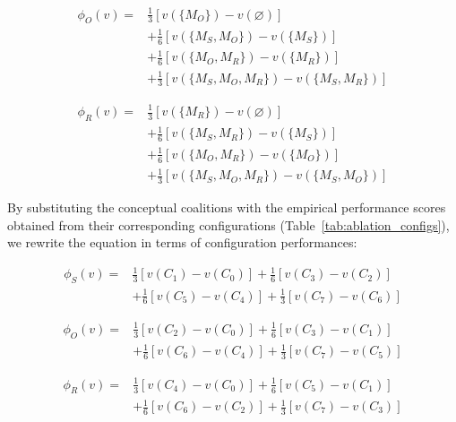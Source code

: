 \documentclass[preprint,review,12pt,authoryear]{elsarticle}
\begin{document}
\begin{equation}
    \begin{split}
        \phi_O(v) = {} & \frac{1}{3}[v(\{M_O\})-v(\varnothing)]           \\
                    & +\frac{1}{6}[v(\{M_S, M_O\})-v(\{M_S\})]         \\
                    & +\frac{1}{6}[v(\{M_O, M_R\})-v(\{M_R\})]         \\
                    & +\frac{1}{3}[v(\{M_S, M_O,M_R\})-v(\{M_S,M_R\})]
    \end{split}
\end{equation}

\begin{equation}
    \begin{split}
        \phi_R(v) = {} & \frac{1}{3}[v(\{M_R\})-v(\varnothing)]           \\
                    & +\frac{1}{6}[v(\{M_S, M_R\})-v(\{M_S\})]         \\
                    & +\frac{1}{6}[v(\{M_O, M_R\})-v(\{M_O\})]         \\
                    & +\frac{1}{3}[v(\{M_S, M_O,M_R\})-v(\{M_S,M_O\})]
    \end{split}
\end{equation}

By substituting the conceptual coalitions with the empirical performance scores obtained from their corresponding configurations (Table~\ref{tab:ablation_configs}), we rewrite the equation in terms of configuration performances:

\begin{equation}
    \begin{split}
        \phi_S(v) = {} & \frac{1}{3}[v(C_1)-v(C_0)]+\frac{1}{6}[v(C_3)-v(C_2)]  \\
                    & +\frac{1}{6}[v(C_5)-v(C_4)]+\frac{1}{3}[v(C_7)-v(C_6)]
    \end{split}
\end{equation}

\begin{equation}
    \begin{split}
        \phi_O(v) = {} & \frac{1}{3}[v(C_2)-v(C_0)]+\frac{1}{6}[v(C_3)-v(C_1)]  \\
                    & +\frac{1}{6}[v(C_6)-v(C_4)]+\frac{1}{3}[v(C_7)-v(C_5)]
    \end{split}
\end{equation}

\begin{equation}
    \begin{split}
        \phi_R(v) = {} & \frac{1}{3}[v(C_4)-v(C_0)]+\frac{1}{6}[v(C_5)-v(C_1)]  \\
                    & +\frac{1}{6}[v(C_6)-v(C_2)]+\frac{1}{3}[v(C_7)-v(C_3)]
    \end{split}
\end{equation}
\end{document}
